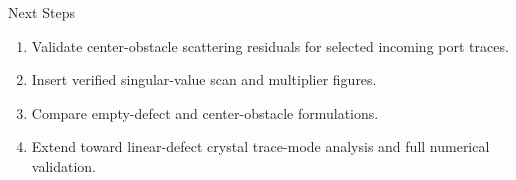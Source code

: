 \documentclass[aspectratio=169]{beamer}
\begin{document}
\begin{frame}{Next Steps}
  \begin{enumerate}
    \item Validate center-obstacle scattering residuals for selected incoming port traces.
    \item Insert verified singular-value scan and multiplier figures.
    \item Compare empty-defect and center-obstacle formulations.
    \item Extend toward linear-defect crystal trace-mode analysis and full numerical validation.
  \end{enumerate}
\end{frame}
\end{document}
